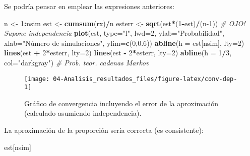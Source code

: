 \documentclass[
]{book}
\newenvironment{Shaded}{\begin{snugshade}}{\end{snugshade}}
\newcommand{\CommentTok}[1]{\textcolor[rgb]{0.56,0.35,0.01}{\textit{#1}}}
\newcommand{\DataTypeTok}[1]{\textcolor[rgb]{0.13,0.29,0.53}{#1}}
\newcommand{\DecValTok}[1]{\textcolor[rgb]{0.00,0.00,0.81}{#1}}
\newcommand{\FloatTok}[1]{\textcolor[rgb]{0.00,0.00,0.81}{#1}}
\newcommand{\KeywordTok}[1]{\textcolor[rgb]{0.13,0.29,0.53}{\textbf{#1}}}
\newcommand{\NormalTok}[1]{#1}
\newcommand{\OperatorTok}[1]{\textcolor[rgb]{0.81,0.36,0.00}{\textbf{#1}}}
\newcommand{\StringTok}[1]{\textcolor[rgb]{0.31,0.60,0.02}{#1}}
\theoremstyle{break}
\theoremstyle{definition}
\theoremstyle{definition}
\theoremstyle{definition}
\theoremstyle{remark}
\begin{document}
Se podría pensar en emplear las expresiones anteriores:

\begin{Shaded}
\begin{Highlighting}[]
\NormalTok{n <-}\StringTok{ }\DecValTok{1}\OperatorTok{:}\NormalTok{nsim}
\NormalTok{est <-}\StringTok{ }\KeywordTok{cumsum}\NormalTok{(rx)}\OperatorTok{/}\NormalTok{n}
\NormalTok{esterr <-}\StringTok{ }\KeywordTok{sqrt}\NormalTok{(est}\OperatorTok{*}\NormalTok{(}\DecValTok{1}\OperatorTok{-}\NormalTok{est)}\OperatorTok{/}\NormalTok{(n}\DecValTok{-1}\NormalTok{)) }\CommentTok{# OJO! Supone independencia}
\KeywordTok{plot}\NormalTok{(est, }\DataTypeTok{type=}\StringTok{"l"}\NormalTok{, }\DataTypeTok{lwd=}\DecValTok{2}\NormalTok{, }\DataTypeTok{ylab=}\StringTok{"Probabilidad"}\NormalTok{, }
     \DataTypeTok{xlab=}\StringTok{"Número de simulaciones"}\NormalTok{, }\DataTypeTok{ylim=}\KeywordTok{c}\NormalTok{(}\DecValTok{0}\NormalTok{,}\FloatTok{0.6}\NormalTok{))}
\KeywordTok{abline}\NormalTok{(}\DataTypeTok{h =}\NormalTok{ est[nsim], }\DataTypeTok{lty=}\DecValTok{2}\NormalTok{)}
\KeywordTok{lines}\NormalTok{(est }\OperatorTok{+}\StringTok{ }\DecValTok{2}\OperatorTok{*}\NormalTok{esterr, }\DataTypeTok{lty=}\DecValTok{2}\NormalTok{) }
\KeywordTok{lines}\NormalTok{(est }\OperatorTok{-}\StringTok{ }\DecValTok{2}\OperatorTok{*}\NormalTok{esterr, }\DataTypeTok{lty=}\DecValTok{2}\NormalTok{)}
\KeywordTok{abline}\NormalTok{(}\DataTypeTok{h =} \DecValTok{1}\OperatorTok{/}\DecValTok{3}\NormalTok{, }\DataTypeTok{col=}\StringTok{"darkgray"}\NormalTok{)     }\CommentTok{# Prob. teor. cadenas Markov}
\end{Highlighting}
\end{Shaded}

\begin{figure}[!htb]

{\centering \texttt{[image: 04-Analisis\_resultados\_files/figure-latex/conv-dep-1]} 

}

\caption{Gráfico de convergencia incluyendo el error de la aproximación (calculado asumiendo independencia).}\label{fig:conv-dep}
\end{figure}

La aproximación de la proporción sería correcta (es consistente):

\begin{Shaded}
\begin{Highlighting}[]
\NormalTok{est[nsim]}
\end{Highlighting}
\end{Shaded}
\end{document}
